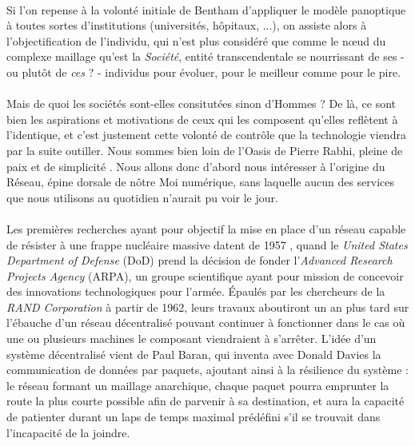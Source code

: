 \paragraph{} Si l'on repense à la volonté initiale de Bentham d'appliquer le modèle panoptique à toutes sortes d'institutions
(universités, hôpitaux, ...), on assiste alors à l'objectification de l'individu, qui n'est plus considéré que comme le 
n\oe{}ud du complexe maillage qu'est la \emph{Société}, entité transcendentale se nourrissant de ses - ou plutôt de 
\emph{ces} ? - individus pour évoluer, pour le meilleur comme pour le pire.

\paragraph{} Mais de quoi les sociétés sont-elles consitutées sinon d'Hommes ? De là, ce sont bien les aspirations et 
motivations de ceux qui les composent qu'elles reflètent à l'identique, et c'est justement cette volonté de contrôle que
la technologie viendra par la suite outiller. Nous sommes bien loin de l'Oasis de Pierre Rabhi, pleine de paix et de
simplicité \cite{Rabhi1}. Nous allons donc d'abord nous intéresser à l'origine du Réseau, épine dorsale de nôtre Moi 
numérique, sans laquelle aucun des services que nous utilisons au quotidien n'aurait pu voir le jour.

\paragraph{} Les premières recherches ayant pour objectif la mise en place d'un réseau capable de résister à une frappe
nucléaire massive datent de 1957 \cite{Internet0}, quand le \emph{United States Department of Defense} (DoD) prend la
décision de fonder l'\emph{Advanced Research Projects Agency} (ARPA), un groupe scientifique ayant pour mission de concevoir
des innovations technologiques pour l'armée. Épaulés par les chercheurs de la \emph{RAND Corporation} à partir de 1962,
leurs travaux aboutiront un an plus tard sur l'ébauche d'un réseau décentralisé pouvant continuer à fonctionner dans le
cas où une ou plusieurs machines le composant viendraient à s'arrêter. L'idée d'un système décentralisé vient de Paul Baran,
qui inventa avec Donald Davies la communication de données par paquets, ajoutant ainsi à la résilience du système : le réseau
formant un maillage anarchique, chaque paquet pourra emprunter la route la plus courte possible afin de parvenir à sa 
destination, et aura la capacité de patienter durant un laps de temps maximal prédéfini s'il se trouvait dans l'incapacité
de la joindre.

